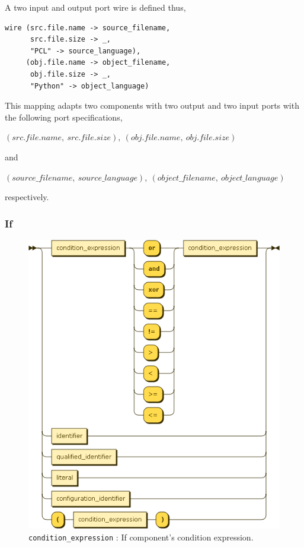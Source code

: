 A two input and output port wire is defined thus,
\begin{center}
  \begin{verbatim}
wire (src.file.name -> source_filename,
      src.file.size -> _,
      "PCL" -> source_language),
     (obj.file.name -> object_filename,
      obj.file.size -> _,
      "Python" -> object_language)
  \end{verbatim}
\end{center}
This mapping adapts two components with two output and two input ports with the following port specifications,
\begin{center}
$(src.file.name,\ src.file.size),\ (obj.file.name,\ obj.file.size)$
\end{center}
and
\begin{center}
$(source\_filename,\ source\_language),\ (object\_filename,\ object\_language)$
\end{center}
respectively.

\subsubsection{If}\label{sec:if}

\begin{figure}[!h]
  \centering
    \includegraphics[scale=\DiagramScale]{chapters/compiler/diagrams/condition_expression}
  \caption{\texttt{condition\_expression} : If component's condition expression.}
  \label{fig:pcl-cond-expr}
\end{figure}

